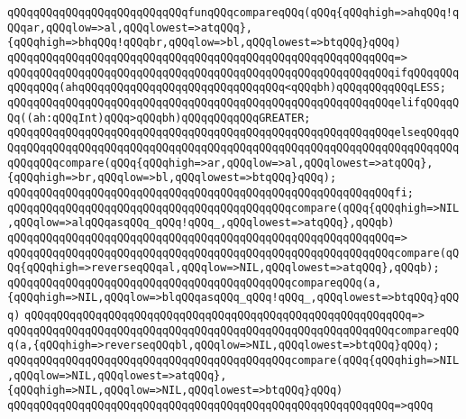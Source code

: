 \newline
\newline
\verb|qQQqqQQqqQQqqQQqqQQqqQQqqQQqfunqQQqcompareqQQq(qQQq{qQQqhigh=>ahqQQq!qQQqar,qQQqlow=>al,qQQqlowest=>atqQQq},{qQQqhigh=>bhqQQq!qQQqbr,qQQqlow=>bl,qQQqlowest=>btqQQq}qQQq)|\newline
\verb|qQQqqQQqqQQqqQQqqQQqqQQqqQQqqQQqqQQqqQQqqQQqqQQqqQQqqQQqqQQq=>|\newline
\verb|qQQqqQQqqQQqqQQqqQQqqQQqqQQqqQQqqQQqqQQqqQQqqQQqqQQqqQQqqQQqifqQQqqQQqqQQqqQQq(ahqQQqqQQqqQQqqQQqqQQqqQQqqQQqqQQq<qQQqbh)qQQqqQQqqQQqLESS;|\newline
\verb|qQQqqQQqqQQqqQQqqQQqqQQqqQQqqQQqqQQqqQQqqQQqqQQqqQQqqQQqqQQqelifqQQqqQQq((ah:qQQqInt)qQQq>qQQqbh)qQQqqQQqqQQqGREATER;|\newline
\verb|qQQqqQQqqQQqqQQqqQQqqQQqqQQqqQQqqQQqqQQqqQQqqQQqqQQqqQQqqQQqelseqQQqqQQqqQQqqQQqqQQqqQQqqQQqqQQqqQQqqQQqqQQqqQQqqQQqqQQqqQQqqQQqqQQqqQQqqQQqqQQqqQQqcompare(qQQq{qQQqhigh=>ar,qQQqlow=>al,qQQqlowest=>atqQQq},{qQQqhigh=>br,qQQqlow=>bl,qQQqlowest=>btqQQq}qQQq);|\newline
\verb|qQQqqQQqqQQqqQQqqQQqqQQqqQQqqQQqqQQqqQQqqQQqqQQqqQQqqQQqqQQqfi;|\newline
\newline
\verb|qQQqqQQqqQQqqQQqqQQqqQQqqQQqqQQqqQQqqQQqqQQqcompare(qQQq{qQQqhigh=>NIL,qQQqlow=>alqQQqasqQQq_qQQq!qQQq_,qQQqlowest=>atqQQq},qQQqb)|\newline
\verb|qQQqqQQqqQQqqQQqqQQqqQQqqQQqqQQqqQQqqQQqqQQqqQQqqQQqqQQqqQQq=>|\newline
\verb|qQQqqQQqqQQqqQQqqQQqqQQqqQQqqQQqqQQqqQQqqQQqqQQqqQQqqQQqqQQqcompare(qQQq{qQQqhigh=>reverseqQQqal,qQQqlow=>NIL,qQQqlowest=>atqQQq},qQQqb);|\newline
\newline
\verb|qQQqqQQqqQQqqQQqqQQqqQQqqQQqqQQqqQQqqQQqqQQqcompareqQQq(a,{qQQqhigh=>NIL,qQQqlow=>blqQQqasqQQq_qQQq!qQQq_,qQQqlowest=>btqQQq}qQQq)|\newline
\verb|qQQqqQQqqQQqqQQqqQQqqQQqqQQqqQQqqQQqqQQqqQQqqQQqqQQqqQQqqQQq=>|\newline
\verb|qQQqqQQqqQQqqQQqqQQqqQQqqQQqqQQqqQQqqQQqqQQqqQQqqQQqqQQqqQQqcompareqQQq(a,{qQQqhigh=>reverseqQQqbl,qQQqlow=>NIL,qQQqlowest=>btqQQq}qQQq);|\newline
\newline
\verb|qQQqqQQqqQQqqQQqqQQqqQQqqQQqqQQqqQQqqQQqqQQqcompare(qQQq{qQQqhigh=>NIL,qQQqlow=>NIL,qQQqlowest=>atqQQq},{qQQqhigh=>NIL,qQQqlow=>NIL,qQQqlowest=>btqQQq}qQQq)|\newline
\verb|qQQqqQQqqQQqqQQqqQQqqQQqqQQqqQQqqQQqqQQqqQQqqQQqqQQqqQQqqQQq=>qQQq|\newline
